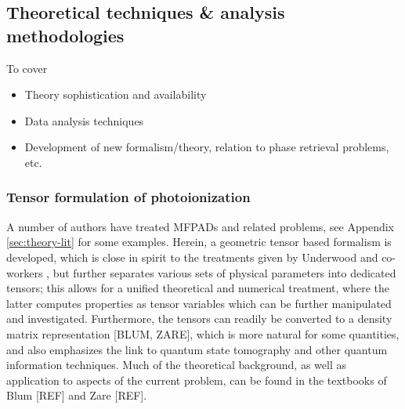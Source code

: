 \subsection{Theoretical techniques \& analysis methodologies}

To cover 

\begin{itemize}
\item Theory sophistication and availability
\item Data analysis techniques
\item Development of new formalism/theory, relation to phase retrieval problems, etc.
\end{itemize}

\subsubsection{Tensor formulation of photoionization}

A number of authors have treated MFPADs and related problems, see Appendix \ref{sec:theory-lit} for some examples. Herein, a geometric tensor based formalism is developed, which is close in spirit to the treatments given by Underwood and co-workers \cite{Reid2000, Stolow2008, Underwood2000}, but further separates various sets of physical parameters into dedicated tensors; this allows for a unified theoretical and numerical treatment, where the latter computes properties as tensor variables which can be further manipulated and investigated.%
Furthermore, the tensors can readily be converted to a density matrix representation [BLUM, ZARE], which is more natural for some quantities, and also emphasizes the link to quantum state tomography and other quantum information techniques. Much of the theoretical background, as well as application to aspects of the current problem, can be found in the textbooks of Blum [REF] and Zare [REF].

